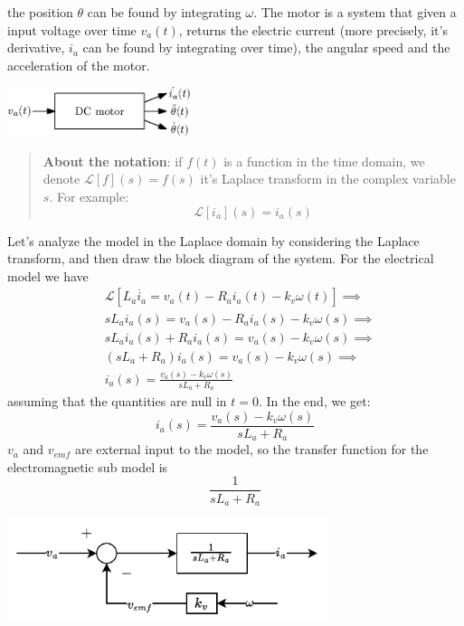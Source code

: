 \documentclass[10pt, letterpaper]{report}
\begin{document}
the position $\theta$ can be found by integrating $\omega$. The motor is a system that given a input voltage over time $v_a(t)$, returns the electric current (more precisely, it's derivative, $i_a$ can be found by integrating over time), the angular speed  and the acceleration of the motor.\begin{center}
    \includegraphics[width=0.4\textwidth ]{images/motor_abstract.eps}
\end{center}
\begin{quote}
    \textbf{About the notation}: if $f(t)$ is a function in the time domain, we denote $\mathcal L[f](s)=f(s)$ it's Laplace transform in the complex variable $s$. For example: \begin{equation}
        \mathcal L[i_a](s)=i_a(s)
    \end{equation}
\end{quote}
Let's analyze the model in the Laplace domain by considering the Laplace transform, and then draw the block diagram of the system. For the electrical model we have\begin{align}
    &\mathcal L\left[ \displaystyle L_a\dot{i_a}=v_a(t)-R_ai_a(t)-k_v\omega(t) \right]\implies\\ 
    &sL_a i_a(s)=v_a(s)-R_ai_a(s)-k_v\omega(s)\implies\\
    &sL_a i_a(s)+R_ai_a(s)=v_a(s)-k_v\omega(s) \implies \\
    &(sL_a+R_a)i_a(s)=v_a(s)-k_v\omega(s) \implies\\
    &i_a(s)=\frac{v_a(s)-k_v\omega(s)}{sL_a+R_a}
\end{align}
assuming that the quantities are null in $t=0$. In the end, we get:\begin{equation}
    i_a(s)=\frac{v_a(s)-k_v\omega(s)}{sL_a+R_a}
\end{equation}
$v_a$ and $v_{emf}$ are external input to the model, so the transfer function for the electromagnetic sub model is\begin{equation}
    \frac{1}{sL_a+R_a}
\end{equation}
\begin{center}
    \includegraphics[width=0.7\textwidth ]{images/EM_model.drawio.pdf}
\end{center}
\end{document}
